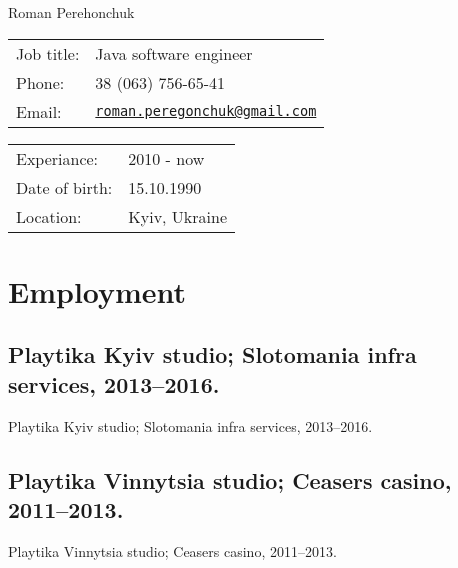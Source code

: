 \documentclass[letterpaper]{article}
\def\name{Roman Perehonchuk}
\renewenvironment{itemize}{
  \begin{list}{}{
    \setlength{\leftmargin}{1.5em}
  }
}{
  \end{list}
}
\begin{document}
{\huge \name}


\vspace{0.25in}

\begin{minipage}{0.45\linewidth}
  \begin{tabular}{ll}
    Job title: & Java software engineer \\
    Phone: & 38 (063) 756-65-41 \\
    Email: & \href{mailto:roman.peregonchuk@gmail.com}{\tt roman.peregonchuk@gmail.com} \\
  \end{tabular}
\end{minipage}
\begin{minipage}{0.45\linewidth}
  \begin{tabular}{ll}
    Experiance: & 2010 - now \\
    Date of birth: & 15.10.1990 \\
    Location: & Kyiv, Ukraine \\
  \end{tabular}
\end{minipage}

\section*{Employment}

\subsection*{Playtika Kyiv studio; Slotomania infra services, 2013--2016.}

\begin{itemize}
\item Playtika Kyiv studio; Slotomania infra services, 2013--2016.
\end{itemize}

\subsection*{Playtika Vinnytsia studio; Ceasers casino, 2011--2013.}

\begin{itemize}
\item Playtika Vinnytsia studio; Ceasers casino, 2011--2013.
\end{itemize}
\end{document}
